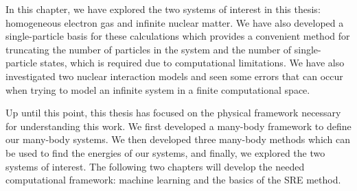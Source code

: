 In this chapter, we have explored the two systems of interest in this thesis: homogeneous electron gas and infinite nuclear matter.  We have also developed a single-particle basis for these calculations which provides a convenient method for truncating the number of particles in the system and the number of single-particle states, which is required due to computational limitations.  We have also investigated two nuclear interaction models and seen some errors that can occur when trying to model an infinite system in a finite computational space.  

Up until this point, this thesis has focused on the physical framework necessary for understanding this work.  We first developed a many-body framework to define our many-body systems.  We then developed three many-body methods which can be used to find the energies of our systems, and finally, we explored the two systems of interest.  The following two chapters will develop the needed computational framework: machine learning and the basics of the SRE method.